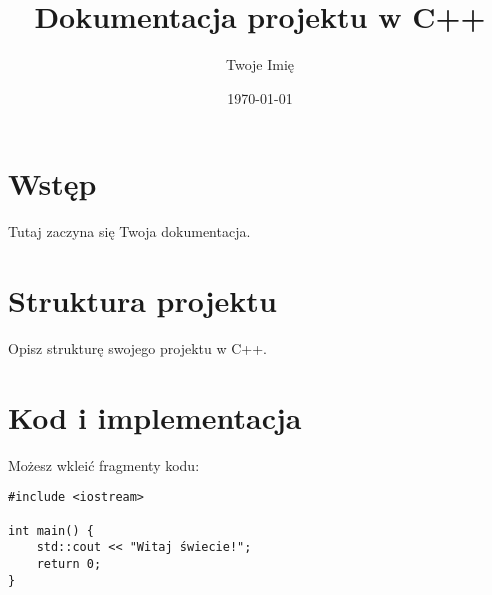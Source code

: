 \documentclass{article}
\title{Dokumentacja projektu w C++}
\author{Twoje Imię}
\date{\today}
\begin{document}
\maketitle

\section{Wstęp}
Tutaj zaczyna się Twoja dokumentacja.

\section{Struktura projektu}
Opisz strukturę swojego projektu w C++.

\section{Kod i implementacja}
Możesz wkleić fragmenty kodu:
\begin{verbatim}
#include <iostream>

int main() {
    std::cout << "Witaj świecie!";
    return 0;
}
\end{verbatim}
\end{document}
